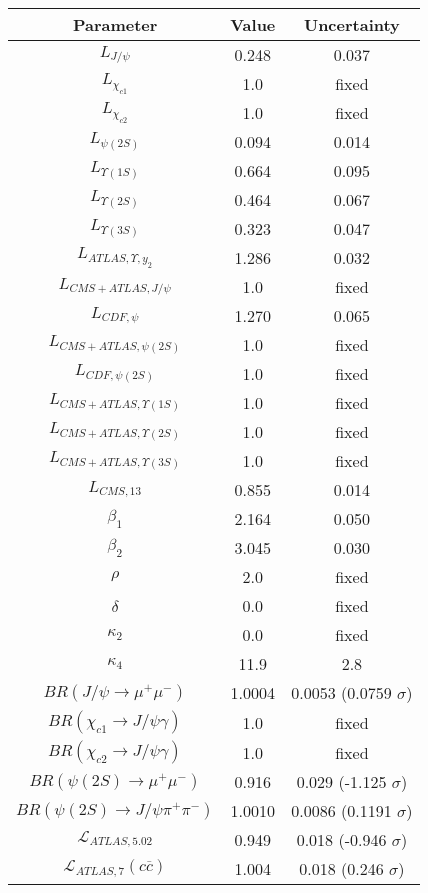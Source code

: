 \begin{table}[h!]
\centering
\begin{tabular}{c|c|c}
Parameter & Value & Uncertainty \\
\hline
$L_{J/\psi}$ & 0.248 & 0.037 \\
$L_{\chi_{c1}}$ & 1.0 & fixed \\
$L_{\chi_{c2}}$ & 1.0 & fixed \\
$L_{\psi(2S)}$ & 0.094 & 0.014 \\
$L_{\Upsilon(1S)}$ & 0.664 & 0.095 \\
$L_{\Upsilon(2S)}$ & 0.464 & 0.067 \\
$L_{\Upsilon(3S)}$ & 0.323 & 0.047 \\
$L_{ATLAS,\Upsilon,y_2}$ & 1.286 & 0.032 \\
$L_{CMS+ATLAS,J/\psi}$ & 1.0 & fixed \\
$L_{CDF,\psi}$ & 1.270 & 0.065 \\
$L_{CMS+ATLAS,\psi(2S)}$ & 1.0 & fixed \\
$L_{CDF,\psi(2S)}$ & 1.0 & fixed \\
$L_{CMS+ATLAS,\Upsilon(1S)}$ & 1.0 & fixed \\
$L_{CMS+ATLAS,\Upsilon(2S)}$ & 1.0 & fixed \\
$L_{CMS+ATLAS,\Upsilon(3S)}$ & 1.0 & fixed \\
$L_{CMS,13}$ & 0.855 & 0.014 \\
$\beta_1$ & 2.164 & 0.050 \\
$\beta_2$ & 3.045 & 0.030 \\
$\rho$ & 2.0 & fixed \\
$\delta$ & 0.0 & fixed \\
$\kappa_2$ & 0.0 & fixed \\
$\kappa_4$ & 11.9 & 2.8 \\
$BR(J/\psi\rightarrow\mu^+\mu^-)$ & 1.0004 & 0.0053 (0.0759 $\sigma$) \\
$BR(\chi_{c1}\rightarrow J/\psi\gamma)$ & 1.0 & fixed \\
$BR(\chi_{c2}\rightarrow J/\psi\gamma)$ & 1.0 & fixed \\
$BR(\psi(2S)\rightarrow\mu^+\mu^-)$ & 0.916 & 0.029 (-1.125 $\sigma$) \\
$BR(\psi(2S)\rightarrow J/\psi\pi^+\pi^-)$ & 1.0010 & 0.0086 (0.1191 $\sigma$) \\
$\mathcal L_{ATLAS,5.02}$ & 0.949 & 0.018 (-0.946 $\sigma$) \\
$\mathcal L_{ATLAS,7}(c\overline c)$ & 1.004 & 0.018 (0.246 $\sigma$) \\

\end{tabular}
\end{table}
